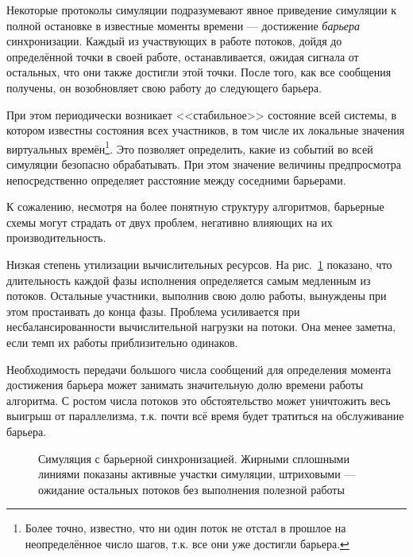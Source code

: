 Некоторые протоколы симуляции подразумевают явное приведение симуляции к полной остановке в известные моменты времени — достижение \textit{барьера} синхронизации. Каждый из участвующих в работе потоков, дойдя до определённой точки в своей работе, останавливается, ожидая сигнала от остальных, что они также достигли этой точки. После того, как все сообщения получены, он возобновляет свою работу до следующего барьера.

При этом периодически возникает <<стабильное>> состояние всей системы, в котором известны состояния всех участников, в том числе их локальные значения виртуальных времён\footnote{Более точно, известно, что ни один поток не отстал в прошлое на неопределённое число шагов, т.к. все они уже достигли барьера.}. Это позволяет определить, какие из событий во всей симуляции безопасно обрабатывать. При этом значение величины предпросмотра непосредственно определяет расстояние между соседними барьерами.

К сожалению, несмотря на более понятную структуру алгоритмов, барьерные схемы могут страдать от двух проблем, негативно влияющих на их производительность.

\begin{enumerate*}
    \item Низкая степень утилизации вычислительных ресурсов. На рис.~\ref{fig:domains} показано, что длительность каждой фазы исполнения определяется самым медленным из потоков. Остальные участники, выполнив свою долю работы, вынуждены при этом простаивать до конца фазы. Проблема усиливается при несбалансированности вычислительной нагрузки на потоки. Она менее заметна, если темп их работы приблизительно одинаков.
    \item Необходимость передачи большого числа сообщений для определения момента достижения барьера может занимать значительную долю времени работы алгоритма. С ростом числа потоков это обстоятельство может уничтожить весь выигрыш от параллелизма, т.к. почти всё время будет тратиться на обслуживание барьера.
\end{enumerate*}

\begin{figure}[htbp]
    \centering
    \caption[Симуляция с барьерной синхронизацией]{Симуляция с барьерной синхронизацией. Жирными сплошными линиями показаны активные участки симуляции, штриховыми — ожидание остальных потоков без выполнения полезной работы}
    \label{fig:domains}
\end{figure}

